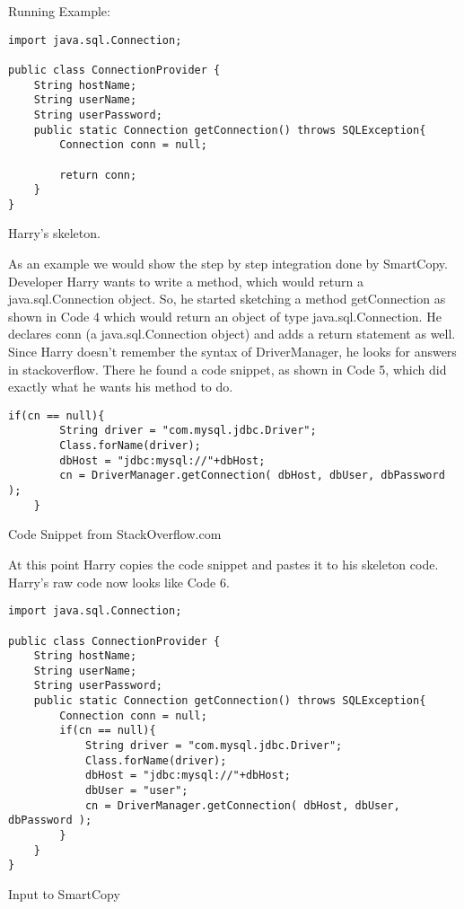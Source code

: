 Running Example:
\begin{code}[H]
\begin{lstlisting}[style=javastyle]
import java.sql.Connection;

public class ConnectionProvider {
	String hostName;
	String userName;
	String userPassword;
	public static Connection getConnection() throws SQLException{
		Connection conn = null;
		
		return conn;
	}
}
\end{lstlisting}
\vspace{\spacebeforecaption{}}
\caption{\label{cd:before}Harry's skeleton.}
\end{code}





As an example we would show the step by step integration done by SmartCopy.
Developer Harry wants to write a method, which would return a java.sql.Connection object. 
So, he started sketching a method getConnection as shown in  Code 4 which would return an object of type java.sql.Connection. 
He declares conn (a java.sql.Connection object) and adds a return statement as well. 
Since Harry doesn\rq t remember the syntax of DriverManager, he looks for answers in stackoverflow. 
There he found a code snippet, as shown in Code 5, which did exactly what he wants his method to do. 
\begin{code}[H]
\begin{lstlisting}[style=javastyle]
	if(cn == null){
	    String driver = "com.mysql.jdbc.Driver";
	    Class.forName(driver);
	    dbHost = "jdbc:mysql://"+dbHost;
	    cn = DriverManager.getConnection( dbHost, dbUser, dbPassword );
	}
\end{lstlisting}
\vspace{\spacebeforecaption{}}
\caption{\label{cd:before}Code Snippet from StackOverflow.com}
\end{code}
At this point Harry copies the code snippet and pastes it to his skeleton code.
Harry\rq s raw code now looks like Code 6. 
\begin{code}[H]
\begin{lstlisting}[style=javastyle]
import java.sql.Connection;

public class ConnectionProvider {
	String hostName;
	String userName;
	String userPassword;
	public static Connection getConnection() throws SQLException{
		Connection conn = null;
		if(cn == null){
		    String driver = "com.mysql.jdbc.Driver";
		    Class.forName(driver);
		    dbHost = "jdbc:mysql://"+dbHost;
		    dbUser = "user";
		    cn = DriverManager.getConnection( dbHost, dbUser, dbPassword );
		}
	}
}
\end{lstlisting}
\vspace{\spacebeforecaption{}}
\caption{\label{cd:before}Input to SmartCopy}
\end{code}

